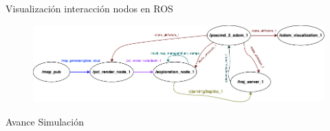 \documentclass[
  24pt, %
  aspectratio=169, %
]{beamer}
\begin{document}
\begin{frame}{Visualización interacción nodos en ROS}
  \begin{figure}
    \centering
    \includegraphics[width=1\textwidth]{ros_nodes}
  \end{figure}
\end{frame}

\begin{frame}{Avance Simulación}
  \begin{figure}
    \centering
  \end{figure}
\end{frame}


  
  
\end{document}

